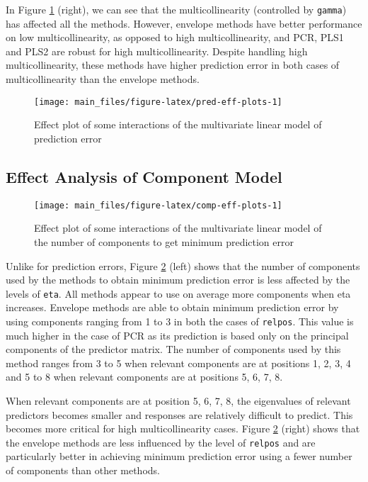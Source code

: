 \documentclass[review]{elsarticle}
\begin{document}
In Figure \ref{fig:pred-eff-plots} (right), we can see that the
multicollinearity (controlled by \texttt{gamma}) has affected all the
methods. However, envelope methods have better performance on low
multicollinearity, as opposed to high multicollinearity, and PCR, PLS1
and PLS2 are robust for high multicollinearity. Despite handling high
multicollinearity, these methods have higher prediction error in both
cases of multicollinearity than the envelope methods.




\begin{figure}
\texttt{[image: main\_files/figure-latex/pred-eff-plots-1]} \caption{Effect plot of some interactions of the multivariate
linear model of prediction error}\label{fig:pred-eff-plots}
\end{figure}

\subsection{Effect Analysis of Component
Model}\label{effect-analysis-of-component-model}




\begin{figure}[!htb]
\texttt{[image: main\_files/figure-latex/comp-eff-plots-1]} \caption{Effect plot of some interactions of the multivariate
linear model of the number of components to get minimum prediction error}\label{fig:comp-eff-plots}
\end{figure}

Unlike for prediction errors, Figure \ref{fig:comp-eff-plots} (left)
shows that the number of components used by the methods to obtain
minimum prediction error is less affected by the levels of \texttt{eta}.
All methods appear to use on average more components when eta increases.
Envelope methods are able to obtain minimum prediction error by using
components ranging from 1 to 3 in both the cases of \texttt{relpos}.
This value is much higher in the case of PCR as its prediction is based
only on the principal components of the predictor matrix. The number of
components used by this method ranges from 3 to 5 when relevant
components are at positions 1, 2, 3, 4 and 5 to 8 when relevant
components are at positions 5, 6, 7, 8.

When relevant components are at position 5, 6, 7, 8, the eigenvalues of
relevant predictors becomes smaller and responses are relatively
difficult to predict. This becomes more critical for high
multicollinearity cases. Figure \ref{fig:comp-eff-plots} (right) shows
that the envelope methods are less influenced by the level of
\texttt{relpos} and are particularly better in achieving minimum
prediction error using a fewer number of components than other methods.
\end{document}
